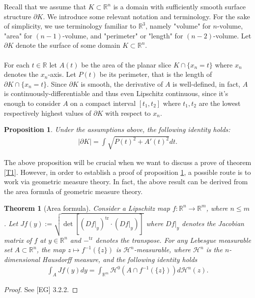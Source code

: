 \documentclass[12pt, a4paper, titlepage]{article}
\newtheorem{proposition}{Proposition}
\newtheorem{thm}{Theorem}
\begin{document}
Recall that we assume that  $K \subset \mathbb{R}^n$ is a domain with sufficiently smooth surface structure $\partial K$. We introduce some relevant notation and terminology. For the sake of simplicity, we use terminology familiar to $\mathbb{R}^3$, namely "volume" for $n$-volume, "area" for $(n-1)$-volume, and "perimeter" or "length" for $(n-2)$-volume. Let $\partial K$ denote the surface of some domain $K \subset \mathbb{R}^n$.
\\\\
For each $t \in \mathbb{R}$ let $A(t)$ be the area of the planar slice $K \cap \{x_n = t\}$ where $x_n$ denotes the $x_n$-axis. Let $P(t)$ be its perimeter, that is the length of $\partial K \cap \{x_n=t\}$. Since $\partial K$ is smooth, the derivative of $A$ is well-defined, in fact, $A$ is continuously-differentiable and thus even Lipschitz continuous, since it's enough to consider $A$ on a compact interval $[t_1,t_2]$ where $t_1,t_2$ are the lowest respectively highest values of $\partial K$ with respect to $x_n$. 
\begin{proposition} \label{P1} Under the assumptions above, the following identity holds:
\begin{align*}
| \partial K| = \int \sqrt{P(t)^2 + A'(t)^2}dt.
\end{align*}
\end{proposition}
\noindent The above proposition will be crucial when we want to discuss a prove of theorem \ref{T1}. However, in order to establish a proof of proposition \ref{P1}, a possible route is to work via geometric measure theory. In fact, the above result can be derived from the area formula of geometric measure theory. 
\begin{thm}[Area formula] Consider a Lipschitz map $f: \mathbb{R}^n \to \mathbb{R}^m$, where $n \leq m$. Let $Jf(y):= \sqrt{ \det[(Df|_y)^\text{tr} \cdot (Df|_y)]}$ where $Df|_y$ denotes the Jacobian matrix of $f$ at $y \in \mathbb{R}^n$ and $-^\text{tr}$ denotes the transpose. For any Lebesgue measurable set $A \subset \mathbb{R}^n$, the map $z \mapsto f^{-1}( \{z\})$ is $\mathcal{H}^n$-measurable, where $\mathcal{H}^n$ is the $n$-dimensional Hausdorff measure, and the following identity holds
\begin{align*}
\int_A Jf(y)dy = \int_{\mathbb{R}^m} \mathcal{H}^0( A \cap f^{-1}( \{z\}))d \mathcal{H}^n (z).
\end{align*}
\end{thm}
\begin{proof} See [EG] 3.2.2. %
\end{proof}
\end{document}
